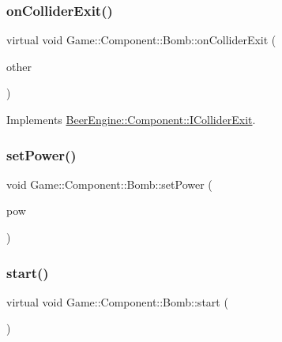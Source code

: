 \subsubsection{\texorpdfstring{on\+Collider\+Exit()}{onColliderExit()}}
{\footnotesize\ttfamily virtual void Game\+::\+Component\+::\+Bomb\+::on\+Collider\+Exit (\begin{DoxyParamCaption}\item[{\mbox{\hyperlink{class_beer_engine_1_1_component_1_1_a_collider}{Beer\+Engine\+::\+Component\+::\+A\+Collider}} $\ast$}]{other }\end{DoxyParamCaption})\hspace{0.3cm}{\ttfamily [virtual]}}



Implements \mbox{\hyperlink{class_beer_engine_1_1_component_1_1_i_collider_exit_a3669477d0003535fbe0411449efc69e9}{Beer\+Engine\+::\+Component\+::\+I\+Collider\+Exit}}.

\mbox{\label{class_game_1_1_component_1_1_bomb_a3432430350d557ef1b7d9ac0339b659a}} 
\subsubsection{\texorpdfstring{set\+Power()}{setPower()}}
{\footnotesize\ttfamily void Game\+::\+Component\+::\+Bomb\+::set\+Power (\begin{DoxyParamCaption}\item[{float}]{pow }\end{DoxyParamCaption})}

\mbox{\label{class_game_1_1_component_1_1_bomb_a74e5f8e628a9d434f0faf91273f33990}} 
\subsubsection{\texorpdfstring{start()}{start()}}
{\footnotesize\ttfamily virtual void Game\+::\+Component\+::\+Bomb\+::start (\begin{DoxyParamCaption}\item[{void}]{ }\end{DoxyParamCaption})\hspace{0.3cm}{\ttfamily [virtual]}}



